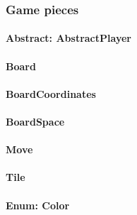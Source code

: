 \documentclass[12pt, letterpaper]{article}
\begin{document}



    \subsubsection{Game pieces}


    \paragraph{Abstract: AbstractPlayer}

    \paragraph{Board}

    \paragraph{BoardCoordinates}

    \paragraph{BoardSpace}

    \paragraph{Move}


    \paragraph{Tile}

    \paragraph{Enum: Color}
\end{document}
